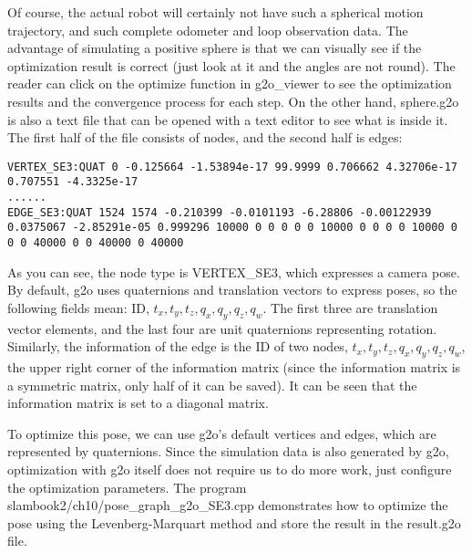 Of course, the actual robot will certainly not have such a spherical motion trajectory, and such complete odometer and loop observation data. The advantage of simulating a positive sphere is that we can visually see if the optimization result is correct (just look at it and the angles are not round). The reader can click on the optimize function in g2o\_viewer to see the optimization results and the convergence process for each step. On the other hand, sphere.g2o is also a text file that can be opened with a text editor to see what is inside it. The first half of the file consists of nodes, and the second half is edges:

\begin{lstlisting}
VERTEX_SE3:QUAT 0 -0.125664 -1.53894e-17 99.9999 0.706662 4.32706e-17 0.707551 -4.3325e-17 
......
EDGE_SE3:QUAT 1524 1574 -0.210399 -0.0101193 -6.28806 -0.00122939 0.0375067 -2.85291e-05 0.999296 10000 0 0 0 0 0 10000 0 0 0 0 10000 0 0 0 40000 0 0 40000 0 40000 
\end{lstlisting}

As you can see, the node type is VERTEX\_SE3, which expresses a camera pose. By default, g2o uses quaternions and translation vectors to express poses, so the following fields mean: ID, $t_x, t_y, t_z, q_x, q_y, q_z, q_w$. The first three are translation vector elements, and the last four are unit quaternions representing rotation. Similarly, the information of the edge is the ID of two nodes, $t_x, t_y, t_z, q_x, q_y, q_z, q_w$, the upper right corner of the information matrix (since the information matrix is ​​a symmetric matrix, only half of it can be saved). It can be seen that the information matrix is ​​set to a diagonal matrix.

To optimize this pose, we can use g2o's default vertices and edges, which are represented by quaternions. Since the simulation data is also generated by g2o, optimization with g2o itself does not require us to do more work, just configure the optimization parameters. The program slambook2/ch10/pose\_graph\_g2o\_SE3.cpp demonstrates how to optimize the pose using the Levenberg-Marquart method and store the result in the result.g2o file.

